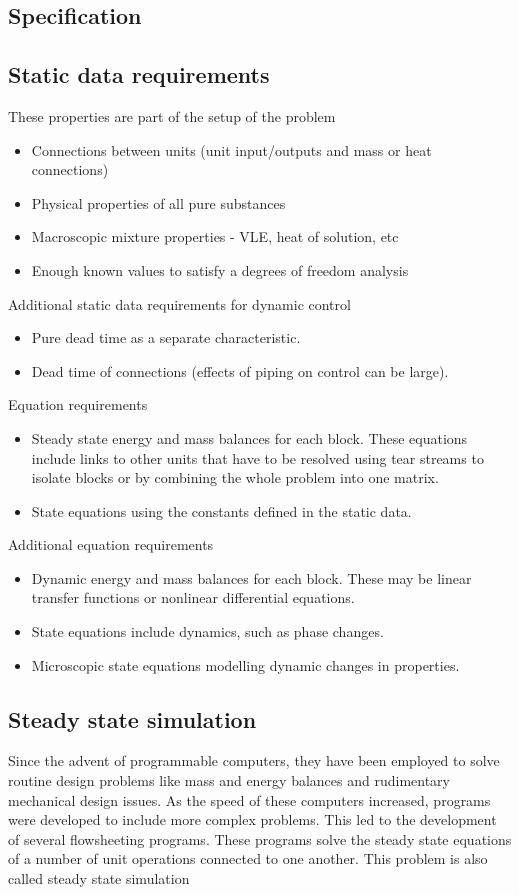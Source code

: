 \subsection{Specification}
\subsection{Static data requirements}
These properties are part of the setup of the problem
\begin{itemize}
\item Connections between units (unit input/outputs and mass or heat connections)
\item Physical properties of all pure substances
\item Macroscopic mixture properties - VLE, heat of solution, etc
\item Enough known values to satisfy a degrees of freedom analysis
\end{itemize}

Additional static data requirements for dynamic control
\begin{itemize}
\item Pure dead time as a separate characteristic.
\item Dead time of connections (effects of piping on control can be large).
\end{itemize}

Equation requirements
\begin{itemize}
\item Steady state energy and mass balances for each block.
These equations include links to other units that have to be resolved using tear streams to isolate blocks or by combining the whole problem into one matrix.
\item State equations using the constants defined in the static data.
\end{itemize}

Additional equation requirements
\begin{itemize}
\item Dynamic energy and mass balances for each block.
  These may be linear transfer functions or nonlinear differential equations.
\item State equations include dynamics, such as phase changes. 
\item Microscopic state equations modelling dynamic changes in properties.
\end{itemize}

\subsection{Steady state simulation}
Since the advent of programmable computers, they have been employed to solve routine design problems like mass and energy balances and rudimentary mechanical design issues.  
As the speed of these computers increased, programs were developed to include more complex problems. 
This led to the development of several flowsheeting programs.  
These programs solve the steady state equations of a number of unit operations connected to one another.  
This problem is also called steady state simulation \citep{westerberg.hutchison.ea1979process}

